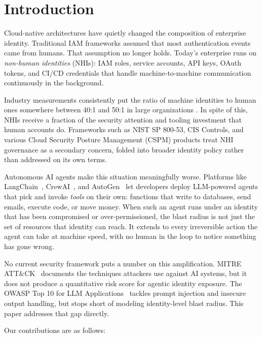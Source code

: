 \documentclass[conference]{IEEEtran}
\begin{document}
\section{Introduction}

Cloud-native architectures have quietly changed the composition of enterprise
identity. Traditional IAM frameworks assumed that most authentication events
came from humans. That assumption no longer holds. Today's enterprise runs on
\emph{non-human identities} (NHIs): IAM roles, service accounts, API keys,
OAuth tokens, and CI/CD credentials that handle machine-to-machine
communication continuously in the background.

Industry measurements consistently put the ratio of machine identities to human
ones somewhere between 40:1 and 50:1 in large organizations
\cite{crowdstrike2024}. In spite of this, NHIs receive a fraction of the
security attention and tooling investment that human accounts do. Frameworks
such as NIST SP 800-53, CIS Controls, and various Cloud Security Posture
Management (CSPM) products treat NHI governance as a secondary concern, folded
into broader identity policy rather than addressed on its own terms.

Autonomous AI agents make this situation meaningfully worse. Platforms like
LangChain~\cite{langchain2023}, CrewAI~\cite{crewai2024}, and
AutoGen~\cite{autogen2023} let developers deploy LLM-powered agents that pick
and invoke \emph{tools} on their own: functions that write to databases, send
emails, execute code, or move money. When such an agent runs under an identity
that has been compromised or over-permissioned, the blast radius is not just
the set of resources that identity can reach. It extends to every irreversible
action the agent can take at machine speed, with no human in the loop to notice
something has gone wrong.

No current security framework puts a number on this amplification. MITRE
ATT\&CK~\cite{mitre2024} documents the techniques attackers use against AI
systems, but it does not produce a quantitative risk score for agentic identity
exposure. The OWASP Top 10 for LLM Applications~\cite{owasp_llm2023} tackles
prompt injection and insecure output handling, but stops short of modeling
identity-level blast radius. This paper addresses that gap directly.

Our contributions are as follows:
\end{document}

